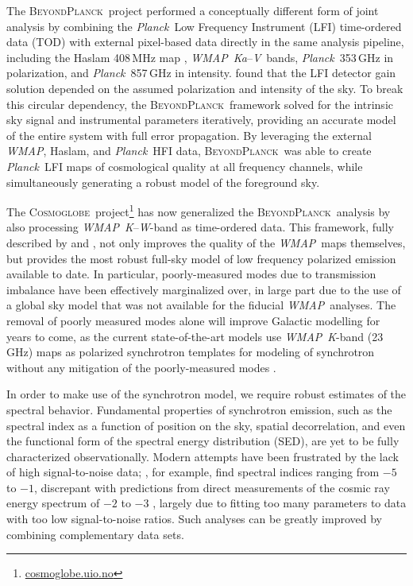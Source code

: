\documentclass[twocolumn]{../../common/aa}
\def\WMAP{\emph{WMAP}}
\def\Planck{\emph{Planck}}
\newcommand{\bp}{\textsc{BeyondPlanck}}
\newcommand{\cosmoglobe}{\textsc{Cosmoglobe}}
\newcommand{\K}[0]{\textit K}
\newcommand{\Ka}[0]{\textit{Ka}}
\newcommand{\V}[0]{\textit V}
\newcommand{\W}[0]{\textit W}
\begin{document}
The \bp\ project performed a conceptually different form of joint analysis by combining the \Planck\ Low Frequency Instrument (LFI) time-ordered data (TOD) \citep{bp01} with external pixel-based data directly in the same analysis pipeline, including the Haslam 408\,MHz map \citep{haslam1982}, \WMAP\ \Ka--\V\ bands, \Planck\ 353\,GHz in polarization, and \Planck\ 857\,GHz in intensity. \citet{planck2016-l02} found that the LFI detector gain solution depended on the assumed polarization and intensity of the sky. To break this circular dependency, the \bp\ framework solved for the intrinsic sky signal and instrumental parameters iteratively, providing an accurate model of the entire system with full error propagation. By leveraging the external \WMAP, Haslam, and \Planck\ HFI  data, \bp\ was able to create \Planck\ LFI maps of cosmological quality at all frequency channels, while simultaneously generating a robust model of the foreground sky.

The \cosmoglobe\ project\footnote{\url{cosmoglobe.uio.no}} has now generalized the \bp\ analysis by also processing  \WMAP\ \K--\W-band as time-ordered data. This framework, fully described by \citet{bp17} and \cite{watts2023_dr1},
not only improves the quality of the \WMAP\ maps themselves, but provides the most robust full-sky model of low frequency polarized emission available to date. In particular, poorly-measured modes due to transmission imbalance \citep{jarosik2007} have been effectively marginalized over, in large part due to the use of a global sky model that was not available for the fiducial \WMAP\ analyses. The removal of poorly measured modes alone will improve Galactic modelling for years to come, as the current state-of-the-art models use \WMAP\ \K-band (23\,GHz) maps as polarized synchrotron templates for modeling of synchrotron without any mitigation of the poorly-measured modes \citep{delabrouille2012,pysm2,pysm3}.

In order to make use of the synchrotron model, we require robust estimates of the spectral behavior. Fundamental properties of synchrotron emission, such as the spectral index as a function of position on the sky, spatial decorrelation, and even the functional form of the spectral energy distribution (SED), are yet to be fully characterized observationally. Modern attempts have been frustrated by the lack of high signal-to-noise data; \citet{deBelsunce:2022}, for example, find spectral indices ranging from $-5$ to $-1$, discrepant with predictions from direct measurements of the cosmic ray energy spectrum of $-2$ to $-3$ \citep{rybicki,orlando2013,neronov2017}, largely due to fitting too many parameters to data with too low signal-to-noise ratios. Such analyses can be greatly improved by combining complementary data sets.
\end{document}
